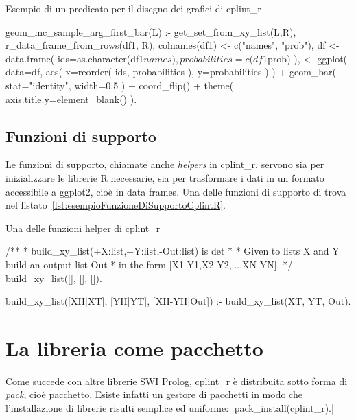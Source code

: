 \documentclass[10pt,titlepage,twoside,a4paper]{report}
\newenvironment{code}{\singlespacing\captionsetup{type=listing}}{}
\begin{document}
\begin{code}
    \caption{Esempio di un predicato per il disegno dei grafici di cplint\_r}
    \label{lst:esempioPredicatoGeomCplintR}
    \begin{prologcode*}{}
geom_mc_sample_arg_first_bar(L) :-
    get_set_from_xy_list(L,R),
    r_data_frame_from_rows(df1, R),
    colnames(df1) <- c("names", "prob"),
    df <- data.frame(
        ids=as.character(df1$names),
        probabilities=c(df1$prob)
    ),
    <- ggplot(
        data=df,
        aes(
            x=reorder(
                ids,
                probabilities
            ),
            y=probabilities
        )
    ) + geom_bar(
        stat="identity",
        width=0.5
    )
    + coord_flip() + theme(
        axis.title.y=element_blank()
    ).
\end{prologcode*}
\end{code}

\subsection{Funzioni di supporto}
Le funzioni di supporto, chiamate anche \emph{helpers} in cplint\_r, servono 
sia per inizializzare le librerie R necessarie, sia per trasformare i dati in 
un formato accessibile a ggplot2, cioè in data frames. Una delle funzioni di
supporto di trova nel listato~\ref{lst:esempioFunzioneDiSupportoCplintR}.

\begin{code}
    \caption{Una delle funzioni helper di cplint\_r}
    \label{lst:esempioFunzioneDiSupportoCplintR}
    \begin{prologcode*}{}
/**
 * build_xy_list(+X:list,+Y:list,-Out:list) is det
 *
 * Given to lists X and Y build an output list Out
 * in the form [X1-Y1,X2-Y2,...,XN-YN].
 */
build_xy_list([], [], []).

build_xy_list([XH|XT], [YH|YT], [XH-YH|Out]) :-
        build_xy_list(XT, YT, Out).
    \end{prologcode*}
\end{code}


\section{La libreria come pacchetto}
Come succede con altre librerie SWI Prolog, cplint\_r è distribuita sotto 
forma di \emph{pack}, cioè pacchetto. Esiste infatti un gestore di pacchetti 
in modo che l'installazione di librerie risulti semplice ed uniforme: 
|pack_install(cplint_r).|
\end{document}
